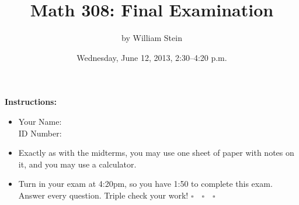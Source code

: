 \documentclass[12pt]{article}
\title{\color{blue}\bf Math 308: Final Examination}
\date{Wednesday, June 12, 2013, 2:30--4:20 p.m.}
\author{by William Stein}
\begin{document}
\maketitle
{\noindent\bf\color{red} Instructions:}
\begin{itemize}
\item {\color{blue} Your Name: \underline{\hspace{20em}}\\ID Number: \underline{\hspace{15em}}}

\item Exactly as with the midterms, you may use one sheet of paper with notes on it, and you may use a calculator.
\item Turn in your exam at 4:20pm, so you have 1:50 to complete this exam.  Answer every question.  Triple check your work!  $\square\quad\square\quad\square$
\end{itemize}
\end{document}
